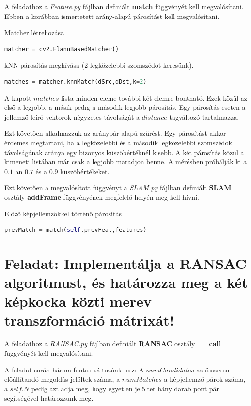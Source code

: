 \documentclass[12pt,a4paper,oneside]{report}             %
\begin{document}
A feladathoz a \emph{Feature.py} fájlban definiált \textbf{match} függvényét kell megvalósítani. Ebben a korábban ismertetett arány-alapú párosítást kell megvalósítani.

Matcher létrehozása

\begin{lstlisting}[language=Python]
matcher = cv2.FlannBasedMatcher()
\end{lstlisting}

kNN párosítás meghívása (2 legközelebbi szomszédot keresünk). 

\begin{lstlisting}[language=Python]
matches = matcher.knnMatch(dSrc,dDst,k=2)
\end{lstlisting}

A kapott $matches$ lista minden eleme további két elemre bontható. Ezek közül az első a legjobb, a másik pedig a második legjobb párosítás. Egy párosítás esetén a jellemző leíró vektorok négyzetes távolságát a $distance$ tagváltozó tartalmazza.

Ezt követően alkalmazzuk az aránypár alapú szűrést. Egy párosítást akkor érdemes megtartani, ha a legközelebbi és a második legközelebbi szomszédok távolságának aránya egy bizonyos küszöbértéknél kisebb. A két párosítás közül a kimeneti listában már csak a legjobb maradjon benne. A mérésben próbálják ki a $0.1$ an $0.7$ és a $0.9$ küszöbértékeket.

Ezt követően a megvalósított függvényt a \emph{SLAM.py} fájlban definiált \textbf{SLAM} osztály \textbf{addFrame} függvényének megfelelő helyén meg kell hívni.

Előző képjellemzőkkel történő párosítás

\begin{lstlisting}[language=Python]
prevMatch = match(self.prevFeat,features)
\end{lstlisting}

\section{Feladat: Implementálja a RANSAC algoritmust, és határozza meg a két képkocka közti merev transzformáció mátrixát!}

A feladathoz a \emph{RANSAC.py} fájlban definiált \textbf{RANSAC} osztály \textbf{\_\_call\_\_} függvényét kell megvalósítani.

A feladat során három fontos változónk lesz: A $numCandidates$ az összesen előállítandó megoldás jelöltek száma, a $numMatches$ a képjellemző párok száma, a $self.N$ pedig azt adja meg, hogy egyetlen jelöltet hány darab pont pár segítségével határozzunk meg.
\end{document}

